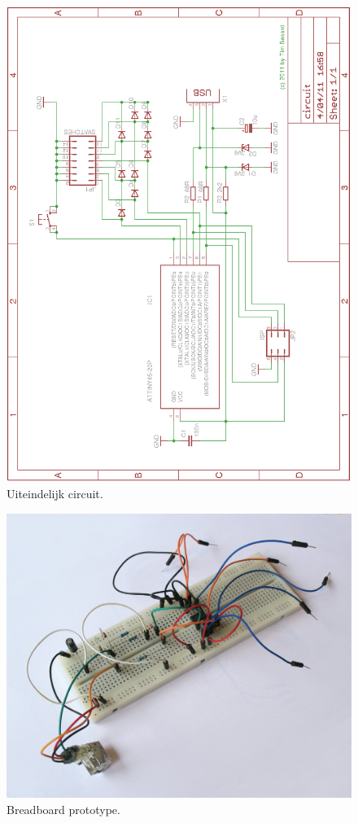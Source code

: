 \begin{figure}
	\includegraphics[width=\textwidth]{afbeeldingen/inputmodule_circuit}
	\caption{Uiteindelijk circuit.}
	\label{fig:circuit}
\end{figure}

\begin{figure}
	\includegraphics[width=\textwidth]{afbeeldingen/inputmodule_breadboard}
	\caption{Breadboard prototype.}
	\label{fig:breadboard}
\end{figure}

